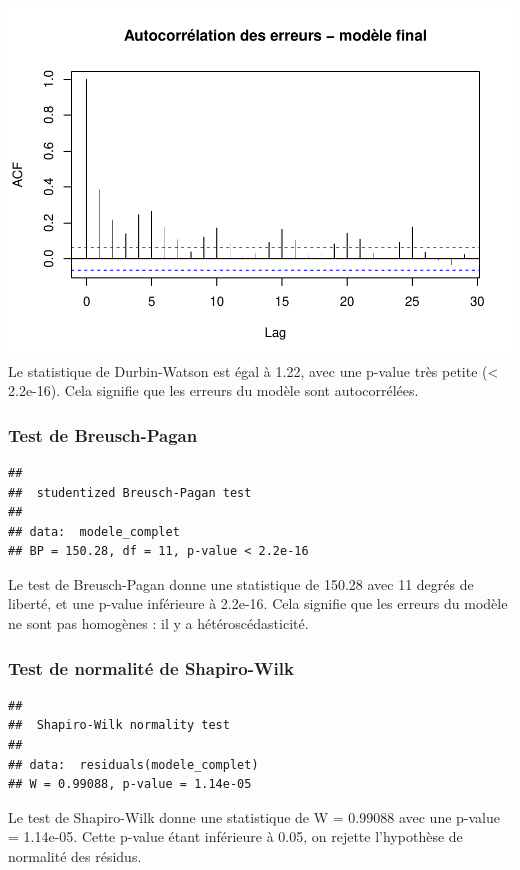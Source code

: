 \documentclass[
  12pt,
]{article}
\begin{document}
\includegraphics{rmd_final_files/figure-latex/unnamed-chunk-57-1.pdf} Le
statistique de Durbin-Watson est égal à 1.22, avec une p-value très
petite (\textless{} 2.2e-16). Cela signifie que les erreurs du modèle
sont autocorrélées.

\subsubsection{Test de Breusch-Pagan}\label{test-de-breusch-pagan}

\begin{verbatim}
## 
##  studentized Breusch-Pagan test
## 
## data:  modele_complet
## BP = 150.28, df = 11, p-value < 2.2e-16
\end{verbatim}

Le test de Breusch-Pagan donne une statistique de 150.28 avec 11 degrés
de liberté, et une p-value inférieure à 2.2e-16. Cela signifie que les
erreurs du modèle ne sont pas homogènes : il y a hétéroscédasticité.

\subsubsection{Test de normalité de
Shapiro-Wilk}\label{test-de-normalituxe9-de-shapiro-wilk}

\begin{verbatim}
## 
##  Shapiro-Wilk normality test
## 
## data:  residuals(modele_complet)
## W = 0.99088, p-value = 1.14e-05
\end{verbatim}

Le test de Shapiro-Wilk donne une statistique de W = 0.99088 avec une
p-value = 1.14e-05. Cette p-value étant inférieure à 0.05, on rejette
l'hypothèse de normalité des résidus.
\end{document}
